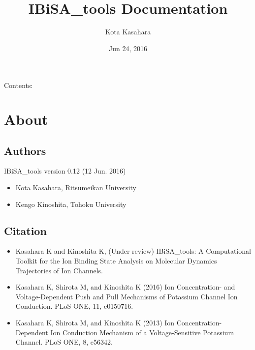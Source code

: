 \documentclass[letterpaper,10pt,english]{sphinxmanual}
\title{IBiSA\_tools Documentation}
\date{Jun 24, 2016}
\author{Kota Kasahara}
\begin{document}
\maketitle
\tableofcontents
{}\label{index::doc}


Contents:


\chapter{About}
\label{about:about}\label{about::doc}\label{about:welcome-to-ibisa-tools-s-documentation}

\section{Authors}
\label{about:authors}
IBiSA\_tools version 0.12 (12 Jun. 2016)
\begin{itemize}
\item {} 
Kota Kasahara, Ritsumeikan University

\item {} 
Kengo Kinoshita, Tohoku University

\end{itemize}


\section{Citation}
\label{about:citation}\begin{itemize}
\item {} 
Kasahara K and Kinoshita K, (Under review) IBiSA\_tools: A Computational Toolkit for the Ion Binding State Analysis on Molecular Dynamics Trajectories of Ion Channels.

\item {} 
Kasahara K, Shirota M, and Kinoshita K (2016) Ion Concentration- and Voltage-Dependent Push and Pull Mechanisms of Potassium Channel Ion Conduction. PLoS ONE, 11, e0150716.

\item {} 
Kasahara K, Shirota M, and Kinoshita K (2013) Ion Concentration-Dependent Ion Conduction Mechanism of a Voltage-Sensitive Potassium Channel. PLoS ONE, 8, e56342.

\end{itemize}
\end{document}
